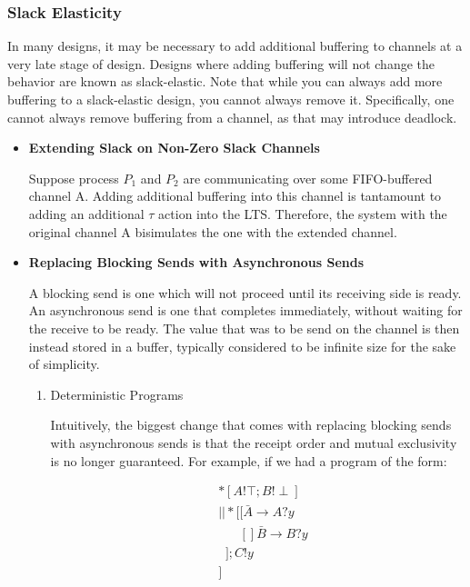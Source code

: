 \documentclass[times, 10pt]{article}
\begin{document}
\subsubsection{Slack Elasticity}

In many designs, it may be necessary to add additional buffering to channels at
a very late stage of design. Designs where adding buffering will not change the
behavior are known as slack-elastic. Note that while you can always add more
buffering to a slack-elastic design, you cannot always remove it. Specifically,
one cannot always remove buffering from a channel, as that may introduce
deadlock.

\begin{itemize}

\item {\bf Extending Slack on Non-Zero Slack Channels}

Suppose process $P_1$ and $P_2$ are communicating over some FIFO-buffered
channel A.  Adding additional buffering into this channel is tantamount to
adding an additional $\tau$ action into the LTS.  Therefore, the system with the
original channel A bisimulates the one with the extended channel. 

\item {\bf Replacing Blocking Sends with Asynchronous Sends}

A blocking send is one which will not proceed until its receiving side is ready.
An asynchronous send is one that completes immediately, without waiting for the
receive to be ready. The value that was to be send on the channel is then
instead stored in a buffer, typically considered to be infinite size for the
sake of simplicity.

\begin{enumerate}

\item Deterministic Programs

Intuitively, the biggest change that comes with replacing blocking sends with
asynchronous sends is that the receipt order and mutual exclusivity is no longer
guaranteed.  For example, if we had a program of the form:

\begin{align*}
&*[A!\top; B!\!\perp] \\
&|| *[[ \bar{A} \rightarrow A?y \\
&\;\;\;\;\;\; [] \bar{B} \rightarrow B?y \\
&\;\;]; C!y \\
&]
\end{align*}


\end{enumerate}
\end{itemize}
\end{document}
